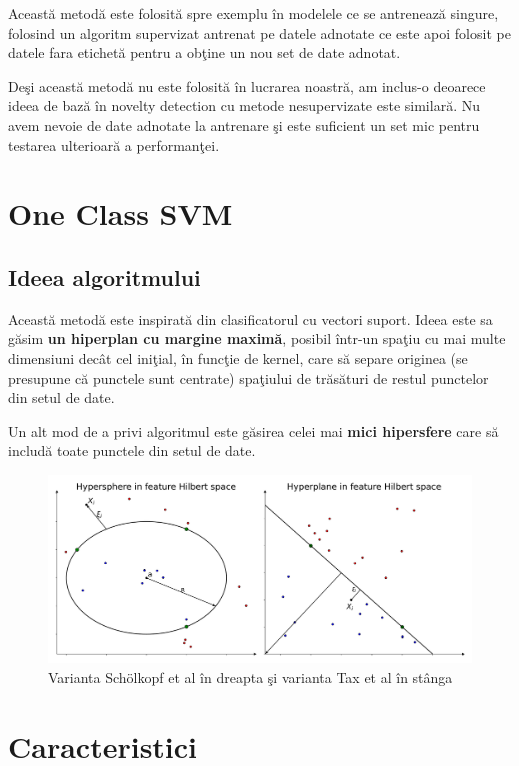 Această metodă este folosită spre exemplu în modelele ce se antrenează singure, 
folosind un algoritm supervizat antrenat pe datele adnotate ce este apoi 
folosit pe datele fara etichetă pentru a obţine un nou set de date adnotat.

Deşi această metodă nu este folosită în lucrarea noastră, am inclus-o deoarece 
ideea de bază în novelty detection cu metode nesupervizate este similară. Nu avem 
nevoie de date adnotate la antrenare şi este suficient un set mic pentru testarea 
ulterioară a performanţei.

\section{One Class SVM}

\subsection{Ideea algoritmului}

Această metodă este inspirată din clasificatorul cu vectori suport. Ideea este 
sa găsim \textbf{un hiperplan cu margine maximă}, posibil într-un spaţiu cu 
mai multe dimensiuni decât cel iniţial, în funcţie de kernel,
care să separe originea (se presupune că punctele sunt centrate) spaţiului de trăsături
de restul punctelor din setul de date\cite{scholkopf2000support}.

Un alt mod de a privi algoritmul este găsirea celei mai \textbf{mici 
hipersfere} care să includă toate punctele din setul de date\cite{tax2004support}.

\begin{figure}[H]
    \centering
    \includegraphics[width=\linewidth]{images/Hyperplane-Hypersphere.pdf}
    \caption{Varianta Schölkopf et al în dreapta şi varianta Tax et al în stânga}
\end{figure}

\section{Caracteristici}

